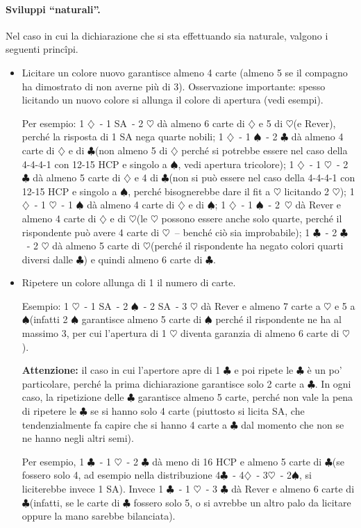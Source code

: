\documentclass[a4paper,10pt]{article}
\renewcommand{\c}{$\clubsuit$\xspace}
\renewcommand{\d}{$\diamondsuit$\xspace}
\newcommand{\h}{$\heartsuit$\xspace}
\newcommand{\s}{$\spadesuit$\xspace}
\newcommand{\sa}{SA\xspace}
\begin{document}
\paragraph{Sviluppi ``naturali''.}
Nel caso in cui la dichiarazione che si sta effettuando sia naturale, valgono i seguenti princ\^ipi.
\begin{itemize}
 \item Licitare un colore nuovo garantisce almeno 4 carte (almeno 5 se il compagno ha dimostrato di non averne più di 3). Osservazione importante: spesso licitando un nuovo colore si allunga il colore di apertura (vedi esempi).
 
 Per esempio: 1 \d\ - 1 \sa\ - 2 \h dà almeno 6 carte di \d e 5 di \h (e Rever), perché la risposta di 1 \sa nega quarte nobili;
 1 \d\ - 1 \s\ - 2 \c dà almeno 4 carte di \d e di \c (non almeno 5 di \d perché si potrebbe essere nel caso della 4-4-4-1 con 12-15 HCP e singolo a \s, vedi apertura tricolore);
 1 \d\ - 1 \h\ - 2 \c dà almeno 5 carte di \d e 4 di \c (non si può essere nel caso della 4-4-4-1 con 12-15 HCP e singolo a \s, perché bisognerebbe dare il fit a \h licitando 2 \h);
 1 \d\ - 1 \h\ - 1 \s dà almeno 4 carte di \d e di \s;
 1 \d\ - 1 \s\ - \hbox{2 \h} dà Rever e almeno 4 carte di \d e di \h (le \h possono essere anche solo quarte, perché il rispondente può avere 4 carte di \h\ -- benché ciò sia improbabile);
 1 \c\ - 2 \c\ - 2 \h dà almeno 5 carte di \h (perché il rispondente ha negato colori quarti diversi dalle \c) e quindi almeno 6 carte di \c.
 
 \item Ripetere un colore allunga di 1 il numero di carte.
 
 Esempio: 1 \h\ - 1 \sa\ - 2 \s\ - 2 \sa\ - 3 \h dà Rever e almeno 7 carte a \h e 5 a \s (infatti 2 \s garantisce almeno 5 carte di \s perché il rispondente ne ha al massimo 3, per cui l'apertura di 1 \h diventa garanzia di almeno 6 carte di \h).
 
 {\bf Attenzione:} il caso in cui l'apertore apre di 1 \c e poi ripete le \c è un po' particolare, perché la prima dichiarazione garantisce solo 2 carte a \c. In ogni caso, la ripetizione delle \c garantisce almeno 5 carte, perché non vale la pena di ripetere le \c se si hanno solo 4 carte (piuttosto si licita \sa, che tendenzialmente fa capire che si hanno 4 carte a \c dal momento che non se ne hanno negli altri semi).
 
 Per esempio, 1 \c\ - 1 \h\ - 2 \c dà meno di 16 HCP e almeno 5 carte di \c (se fossero solo 4, ad esempio nella distribuzione 4\c\ - 4\d\ - 3\h\ - 2\s, si liciterebbe invece 1 \sa).
 Invece 1 \c\ - 1 \h\ - 3 \c dà Rever e almeno 6 carte di \c (infatti, se le carte di \c fossero solo 5, o si avrebbe un altro palo da licitare oppure la mano sarebbe bilanciata).
 

\end{itemize}
\end{document}

